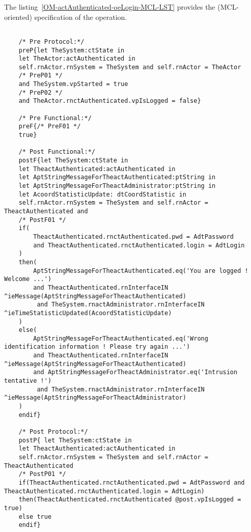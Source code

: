 	\vspace{1cm}
	The listing~\ref{OM-actAuthenticated-oeLogin-MCL-LST} provides the \msrmessir (MCL-oriented) specification of the operation.
	
	\scriptsize
	\vspace{0.5cm}
	\begin{lstlisting}[style=MessirStyle,firstnumber=auto,captionpos=b,caption={\msrmessir (MCL-oriented) specification of the operation \emph{oeLogin}.},label=OM-actAuthenticated-oeLogin-MCL-LST]

	/* Pre Protocol:*/ 
	preP{let TheSystem:ctState in
	let TheActor:actAuthenticated in
	self.rnActor.rnSystem = TheSystem and self.rnActor = TheActor
	/* PreP01 */
	and TheSystem.vpStarted = true
	/* PreP02 */
	and TheActor.rnctAuthenticated.vpIsLogged = false}
	
	/* Pre Functional:*/
	preF{/* PreF01 */
	true}
	
	/* Post Functional:*/ 
	postF{let TheSystem:ctState in
	let TheactAuthenticated:actAuthenticated in
	let AptStringMessageForTheactAuthenticated:ptString in
	let AptStringMessageForTheactAdministrator:ptString in
	let AcoordStatisticUpdate: dtCoordStatistic in
	self.rnActor.rnSystem = TheSystem and self.rnActor = TheactAuthenticated and
	/* PostF01 */
	if(
		TheactAuthenticated.rnctAuthenticated.pwd = AdtPassword 
		and TheactAuthenticated.rnctAuthenticated.login = AdtLogin
	)
	then(
		AptStringMessageForTheactAuthenticated.eq('You are logged ! Welcome ...') 
		and TheactAuthenticated.rnInterfaceIN ^ieMessage(AptStringMessageForTheactAuthenticated)
		 and TheSystem.rnactAdministrator.rnInterfaceIN ^ieTimeStatisticUpdated(AcoordStatisticUpdate)
	)
	else(
		AptStringMessageForTheactAuthenticated.eq('Wrong identification information ! Please try again ...') 
		and TheactAuthenticated.rnInterfaceIN ^ieMessage(AptStringMessageForTheactAuthenticated) 
		and AptStringMessageForTheactAdministrator.eq('Intrusion tentative !')
		 and TheSystem.rnactAdministrator.rnInterfaceIN ^ieMessage(AptStringMessageForTheactAdministrator)
	)
	endif}
	
	/* Post Protocol:*/ 
	postP{ let TheSystem:ctState in
	let TheactAuthenticated:actAuthenticated in
	self.rnActor.rnSystem = TheSystem and self.rnActor = TheactAuthenticated
	/* PostP01 */
	if(TheactAuthenticated.rnctAuthenticated.pwd = AdtPassword and TheactAuthenticated.rnctAuthenticated.login = AdtLogin)
	then(TheactAuthenticated.rnctAuthenticated @post.vpIsLogged = true)
	else true
	endif}
	
	\end{lstlisting}
	\normalsize 
	
